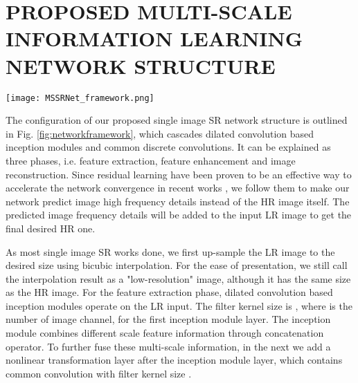 \documentclass{article}
\begin{document}
\section{PROPOSED MULTI-SCALE INFORMATION LEARNING NETWORK STRUCTURE}
\label{sec:proposed}

\begin{figure*}[htb]

\begin{minipage}[b]{1.0\linewidth}
  \centering
  \centerline{\texttt{[image: MSSRNet\_framework.png]}}
\end{minipage}
\vspace{-0.9cm}
\caption{The proposed single image super-resolution network structure with dilated convolution based multi-scale information learning inception module. It uses inception module, which contains different scale dilated convolution, to learn multi-scale information. Multiple inception modules cascade to constitute a deep network to predict high frequency detail information.}
\label{fig:networkframework}
\vspace{-0.4cm}
\end{figure*}

The configuration of our proposed single image SR network structure is outlined in Fig. \ref{fig:networkframework}, which cascades  dilated convolution based inception modules and  common discrete convolutions. It can be explained as three phases, i.e. feature extraction, feature enhancement and image reconstruction. Since residual learning have been proven to be an effective way to accelerate the network convergence in recent works \cite{ref9}, we follow them to make our network predict image high frequency details instead of the HR image itself. The predicted image frequency details will be added to the input LR image to get the final desired HR one.

As most single image SR works done, we first up-sample the LR image to the desired size using bicubic interpolation. For the ease of presentation, we still call the interpolation result as a "low-resolution" image, although it has the same size as the HR image. For the feature extraction phase,  dilated convolution based inception modules operate on the LR input. The filter kernel size is , where  is the number of image channel, for the first inception module layer. The inception module combines different scale feature information through concatenation operator. To further fuse these multi-scale information, in the next we add a nonlinear transformation layer after the inception module layer, which contains  common convolution with filter kernel size . 
\end{document}
